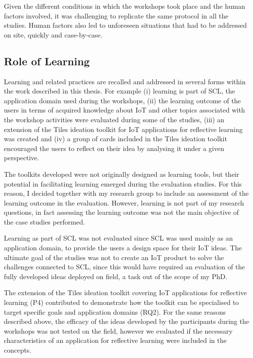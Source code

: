 Given the different conditions in which the workshops took place and the human factors involved, it was challenging to replicate the same protocol in all the studies. Human factors also led to unforeseen situations that had to be addressed on site, quickly and case-by-case.

\subsection{Role of Learning}
Learning and related practices are recalled and addressed in several forms within the work described in this thesis.
For example (i) learning is part of SCL, the application domain used during the workshops, (ii) the learning outcome of the users in terms of acquired knowledge about IoT and other topics associated with the workshop activities were evaluated during some of the studies, (iii) an extension of the Tiles ideation toolkit for IoT applications for reflective learning was created and (iv) a group of cards included in the Tiles ideation toolkit encouraged the users to reflect on their idea by analysing it under a given perspective.

The toolkits developed were not originally designed as learning tools, but their potential in facilitating learning emerged during the evaluation studies. For this reason, I decided together with my research group to include an assessment of the learning outcome in the evaluation. However, learning is not part of my research questions, in fact assessing the learning outcome was not the main objective of the case studies performed.

Learning as part of SCL was not evaluated since SCL was used mainly as an application domain, to provide the users a design space for their IoT ideas. The ultimate goal of the studies was not to create an IoT product to solve the challenges connected to SCL, since this would have required an evaluation of the fully developed ideas deployed on field, a task out of the scope of my PhD.

The extension of the Tiles ideation toolkit covering IoT applications for reflective learning (P4) contributed to demonstrate how the toolkit can be specialised to target specific goals and application domains (RQ2). For the same reasons described above, the efficacy of the ideas developed by the participants during the workshops was not tested on the field, however we evaluated if the necessary characteristics of an application for reflective learning were included in the concepts.

